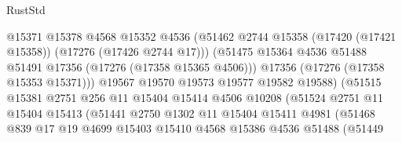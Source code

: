 \begin{lexlean}{RustStd}
\begin{coremodule}
                                    @15371
                                    @15378
                                    @4568
                                    @15352
                                    @4536
                                    (@51462
                                      @2744
                                      @15358
                                      (@17420 (@17421 @15358))
                                      (@17276 (@17426 @2744 @17)))
                                    (@51475
                                      @15364
                                      @4536
                                      @51488
                                      @51491
                                      @17356
                                      (@17276 (@17358 @15365 @4506)))
                                    @17356
                                    (@17276 (@17358 @15353 @15371)))
                                  @19567
                                  @19570
                                  @19573
                                  @19577
                                  @19582
                                  @19588)
                                (@51515
                                  @15381
                                  @2751
                                  @256
                                  @11
                                  @15404
                                  @15414
                                  @4506
                                  @10208
                                  (@51524
                                    @2751
                                    @11
                                    @15404
                                    @15413
                                    (@51441
                                      @2750
                                      @1302
                                      @11
                                      @15404
                                      @15411
                                      @4981
                                      (@51468
                                        @839
                                        @17
                                        @19
                                        @4699
                                        @15403
                                        @15410
                                        @4568
                                        @15386
                                        @4536
                                        @51488
                                        (@51449

\end{coremodule}
\end{lexlean}
